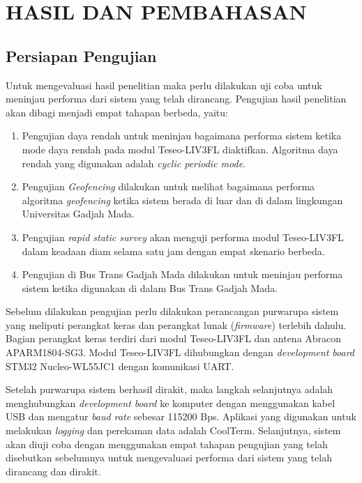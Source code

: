 \chapter{HASIL DAN PEMBAHASAN}

\section{Persiapan Pengujian}
Untuk mengevaluasi hasil penelitian maka perlu dilakukan uji coba untuk meninjau performa dari sistem yang telah dirancang. Pengujian hasil penelitian akan dibagi menjadi empat tahapan berbeda, yaitu:

\begin{enumerate}
	\item Pengujian daya rendah untuk meninjau bagaimana performa sistem ketika mode daya rendah pada modul Teseo-LIV3FL diaktifkan. Algoritma daya rendah yang digunakan adalah \textit{cyclic periodic mode}.
	\item Pengujian \textit{Geofencing} dilakukan untuk melihat bagaimana performa algoritma \textit{geofencing} ketika sistem berada di luar dan di dalam lingkungan Universitas Gadjah Mada.
	\item Pengujian \textit{rapid static survey} akan menguji performa modul Teseo-LIV3FL dalam keadaan diam selama satu jam dengan empat skenario berbeda.
	\item Pengujian di Bus Trans Gadjah Mada dilakukan untuk meninjau performa sistem ketika digunakan di dalam Bus Trans Gadjah Mada.
\end{enumerate}

Sebelum dilakukan pengujian perlu dilakukan perancangan purwarupa sistem yang meliputi perangkat keras dan perangkat lunak (\textit{firmware}) terlebih dahulu. Bagian perangkat keras terdiri dari modul Teseo-LIV3FL dan antena Abracon APARM1804-SG3. Modul Teseo-LIV3FL dihubungkan dengan \textit{development board} STM32 Nucleo-WL55JC1 dengan komunikasi UART.

Setelah purwarupa sistem berhasil dirakit, maka langkah selanjutnya adalah menghubungkan \textit{development board} ke komputer dengan menggunakan kabel USB dan mengatur \textit{baud rate} sebesar 115200 Bps. Aplikasi yang digunakan untuk melakukan \textit{logging} dan perekaman data adalah CoolTerm. Selanjutnya, sistem akan diuji coba dengan menggunakan empat tahapan pengujian yang telah disebutkan sebelumnya untuk mengevaluasi performa dari sistem yang telah dirancang dan dirakit.

